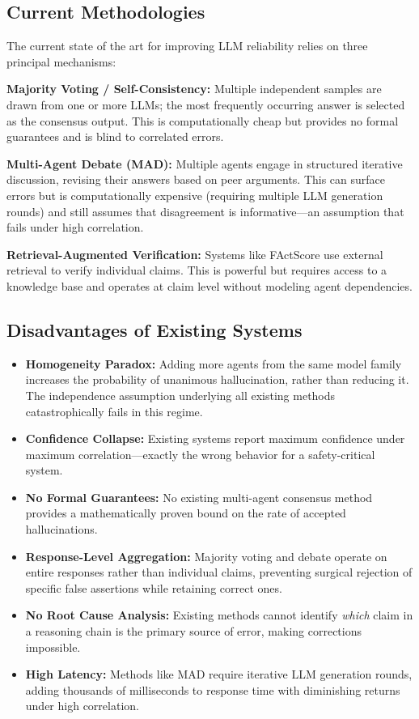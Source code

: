 \documentclass[12pt,a4paper]{report}
\begin{document}
\subsection{Current Methodologies}

The current state of the art for improving LLM reliability relies on three principal mechanisms:

\textbf{Majority Voting / Self-Consistency:} Multiple independent samples are drawn from one or more LLMs; the most frequently occurring answer is selected as the consensus output. This is computationally cheap but provides no formal guarantees and is blind to correlated errors.

\textbf{Multi-Agent Debate (MAD):} Multiple agents engage in structured iterative discussion, revising their answers based on peer arguments. This can surface errors but is computationally expensive (requiring multiple LLM generation rounds) and still assumes that disagreement is informative---an assumption that fails under high correlation.

\textbf{Retrieval-Augmented Verification:} Systems like FActScore use external retrieval to verify individual claims. This is powerful but requires access to a knowledge base and operates at claim level without modeling agent dependencies.

\subsection{Disadvantages of Existing Systems}

\begin{itemize}
    \item \textbf{Homogeneity Paradox:} Adding more agents from the same model family increases the probability of unanimous hallucination, rather than reducing it. The independence assumption underlying all existing methods catastrophically fails in this regime.
    \item \textbf{Confidence Collapse:} Existing systems report maximum confidence under maximum correlation---exactly the wrong behavior for a safety-critical system.
    \item \textbf{No Formal Guarantees:} No existing multi-agent consensus method provides a mathematically proven bound on the rate of accepted hallucinations.
    \item \textbf{Response-Level Aggregation:} Majority voting and debate operate on entire responses rather than individual claims, preventing surgical rejection of specific false assertions while retaining correct ones.
    \item \textbf{No Root Cause Analysis:} Existing methods cannot identify \emph{which} claim in a reasoning chain is the primary source of error, making corrections impossible.
    \item \textbf{High Latency:} Methods like MAD require iterative LLM generation rounds, adding thousands of milliseconds to response time with diminishing returns under high correlation.
\end{itemize}
\end{document}
